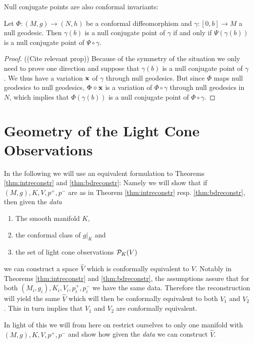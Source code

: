 Null conjugate points are also conformal invariants:
\begin{proposition}
    Let $\Phi:(M,g)\to (N,h)$ be a conformal diffeomorphism and $\gamma:[0,b]\to M$ a null geodesic. Then $\gamma(b)$ is a null conjugate point of $\gamma$ if and only if $\Psi(\gamma(b))$ is a null conjugate point of $\Psi \circ \gamma$.
\end{proposition}
\begin{proof}
    ((Cite relevant prop))
    Because of the symmetry of the situation we only need to prove one direction and suppose that $\gamma(b)$ is a null conjugate point of $\gamma$. We thus have a variation $\mathbf{x}$ of $\gamma$ through null geodesics. But since $\Phi$ maps null geodesics to null geodesics, $\Phi\circ \mathbf{x}$ is a variation of $\Phi \circ \gamma$ through null geodesics in $N$, which implies that $\Phi(\gamma(b))$ is a null conjugate point of $\Phi \circ \gamma$.
\end{proof}

\section{Geometry of the Light Cone Observations}
\begin{remark}[Data]\label{rmk:data} 
    In the following we will use an equivalent formulation to Theorems \ref{thm:intreconstr} and \ref{thm:bdreconstr}: Namely we will show that if $(M,g), K, V, p^+,p^-$ are as in Theorem \ref{thm:intreconstr} resp. \ref{thm:bdreconstr}, then given the \emph{data}
    \begin{enumerate}[label={\textnormal{(\arabic*)}}]
        \item The smooth manifold $K$,
        \item the conformal class of $g\rvert_K$ and
        \item the set of light cone observations ${\mathcal{P}}_K(V)$
    \end{enumerate}
    we can construct a space $\widehat{V}$ which is conformally equivalent to $V$.
    Notably in Theorems \ref{thm:intreconstr} and \ref{thm:bdreconstr}, the assumptions assure that for both $(M_i,g_i), K_i, V_i, p^+_i,p^-_i$ we have the same data. Therefore the reconstruction will yield the same $\widehat{V}$ which will then be conformally equivalent to both $V_1$ and $V_2$. This in turn implies that $V_1$ and $V_2$ are conformally equivalent.

    In light of this we will from here on restrict ourselves to only one manifold with $(M,g), K, V, p^+,p^-$ and show how given the \emph{data} we can construct $\widehat{V}$.
\end{remark}

